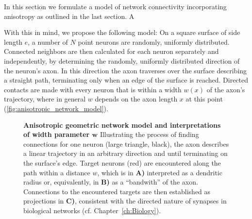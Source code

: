 
In this section we formulate a model of network connectivity
incorporating anisotropy as outlined in the last section. A 

With this in mind, we propose the following model: On a square surface
of side length $e$, a number of $N$ point neurons are randomly,
uniformly distributed.  Connected neighbors are then calculated for
each neuron separately and independently, by determining the randomly,
uniformly distributed direction of the neuron's axon. In this
direction the axon traverses over the surface describing a straight
path, terminating only when an edge of the surface is
reached. Directed contacts are made with every neuron that is within a
width $w(x)$ of the axon's trajectory, where in general $w$ depends on
the axon length $x$ at this point
(\autoref{fig:anisotropic_network_model}).

\begin{figure}[!htbp]
  \centering 
    \caption{%
      \textbf{Anisotropic geometric network model and interpretations
        of width parameter $\boldsymbol w$} Illustrating the process of
      finding connections for one neuron (large triangle, black), the
      axon describes a linear trajectory in an arbitrary direction and
      until terminating on the surface's edge. Target neurons (red)
      are encountered along the path within a distance $w$, which is in
      \textbf{A)} interpreted as a dendritic radius or, equivalently,
      in \textbf{B)} as a \enquote{bandwith} of the axon. Connections
      to the encountered targets are then established as projections
      in \textbf{C)}, consistent with the directed nature of synapses
      in biological networks (cf. Chapter~\ref{ch:Biology}).}
  \label{fig:anisotropic_network_model}
\end{figure}


